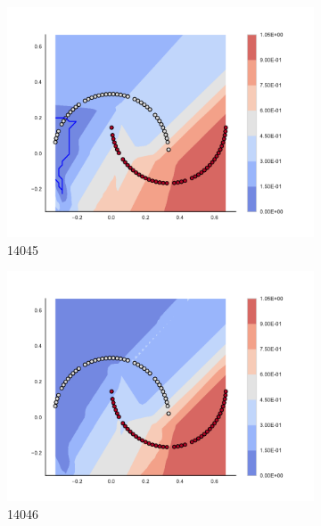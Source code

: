 \begin{figure}[h]
\begin{subfigure}[b]{0.09\textwidth}
    \includegraphics[clip, trim=2.35cm 1.75cm 4.5cm 0cm,width=\textwidth]{img/convergence/14045.pdf}
    \caption{14045}
    \label{fig:convergence_14045}
\end{subfigure}
%
\begin{subfigure}[b]{0.09\textwidth}
    \includegraphics[clip, trim=2.35cm 1.75cm 4.5cm 0cm,width=\textwidth]{img/convergence/14046.pdf}
    \caption{14046}
    \label{fig:convergence_14046}
\end{subfigure}
%
\begin{subfigure}[b]{0.09\textwidth}

\end{subfigure}
\end{figure}
